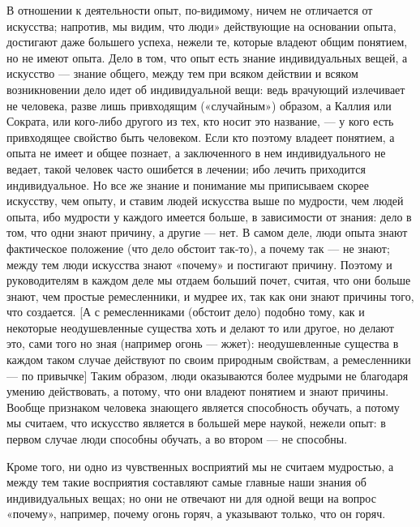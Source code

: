 \documentclass[oneside, 17pt, dvipsnames]{extbook}
\begin{document}
В отношении к деятельности опыт, по-видимому, ничем не отличается от искусства; напротив, мы видим, что люди» действующие на основании опыта, достигают даже большего успеха, нежели те, которые владеют общим понятием, но не имеют опыта. Дело в том, что опыт есть знание индивидуальных вещей, а искусство — знание общего, между тем при всяком действии и всяком возникновении дело идет об индивидуальной вещи: ведь врачующий излечивает не человека, разве лишь привходящим
\footnotemark[3]
(«случайным») образом, а Каллия или Сократа, или кого-либо другого из тех, кто носит это название, — у кого есть привходящее свойство быть человеком. Если кто поэтому владеет понятием, а опыта не имеет и общее познает, а заключенного в нем индивидуального не ведает, такой человек часто ошибется в лечении; ибо лечить приходится индивидуальное. Но все же знание и понимание мы приписываем скорее искусству, чем опыту, и ставим людей искусства
\footnotemark[4]
выше по мудрости, чем людей опыта, ибо мудрости у каждого имеется больше, в зависимости от знания: дело в том, что одни знают причину, а другие — нет. В самом деле, люди опыта знают фактическое положение
\footnotemark[5]
(что дело обстоит так-то), а почему так — не знают; между тем люди искусства знают «почему» и постигают причину. Поэтому и руководителям в каждом деле мы отдаем больший почет, считая, что они больше знают, чем простые ремесленники, и мудрее их, так как они знают причины того, что создается. [А с ремесленниками (обстоит дело) подобно тому, как и некоторые неодушевленные существа хоть и делают то или другое, но делают это, сами того но зная (например огонь — жжет): неодушевленные существа в каждом таком случае действуют по своим природным свойствам, а ремесленники — по привычке]
\footnotemark[6]
Таким образом, люди оказываются более мудрыми не благодаря умению действовать, а потому, что они владеют понятием и знают причины. Вообще признаком человека знающего является способность обучать, а потому мы считаем, что искусство является в большей мере наукой, нежели опыт: в первом случае люди способны обучать, а во втором — не способны.

Кроме того, ни одно из чувственных восприятий мы не считаем мудростью, а между тем такие восприятия составляют самые главные наши знания об индивидуальных вещах; но они не отвечают ни для одной вещи на вопрос «почему», например, почему огонь горяч, а указывают только, что он горяч.
\end{document}
